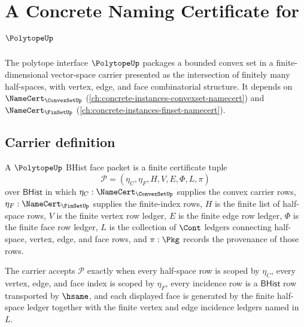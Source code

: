 \chapter{A Concrete Naming Certificate for $\PolytopeUp$}
\label{ch:concrete-instances-polytope-namecert}

The polytope interface $\PolytopeUp$ packages a bounded convex set in a finite-dimensional vector-space carrier presented as the intersection of finitely many half-spaces, with vertex, edge, and face combinatorial structure. It depends on $\NameCert_{\ConvexSetUp}$ (\autoref{ch:concrete-instances-convexset-namecert}) and $\NameCert_{\FinSetUp}$ (\autoref{ch:concrete-instances-finset-namecert}).

\section{Carrier definition}
\label{sec:polytope-carrier}

\begin{definition}
\label{def:polytope-bhist-face-packet}
A $\PolytopeUp$ BHist face packet is a finite certificate tuple
$$
\mathcal{P}=(\eta_C,\eta_F,H,V,E,\Phi,L,\pi)
$$
over $\mathsf{BHist}$ in which $\eta_C:\NameCert_{\ConvexSetUp}$ supplies the
convex carrier rows, $\eta_F:\NameCert_{\FinSetUp}$ supplies the finite-index
rows, $H$ is the finite list of half-space rows, $V$ is the finite vertex row
ledger, $E$ is the finite edge row ledger, $\Phi$ is the finite face row ledger,
$L$ is the collection of $\Cont$ ledgers connecting half-space, vertex, edge,
and face rows, and $\pi:\Pkg$ records the provenance of those rows.

The carrier accepts $\mathcal{P}$ exactly when every half-space row is scoped by
$\eta_C$, every vertex, edge, and face index is scoped by $\eta_F$, every
incidence row is a $\mathsf{BHist}$ row transported by $\hsame$, and each
displayed face is generated by the finite half-space ledger together with the
finite vertex and edge incidence ledgers named in $L$.
\end{definition}

